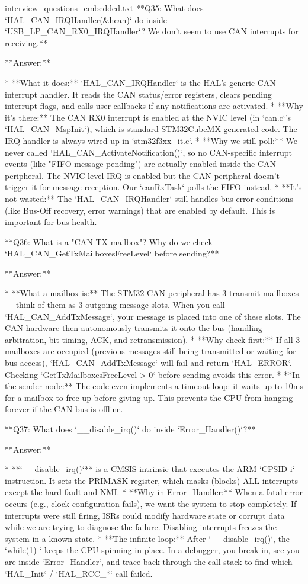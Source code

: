 \begin{filecontents*}{interview_questions_embedded.txt}
**Q35: What does `HAL_CAN_IRQHandler(&hcan)` do inside `USB_LP_CAN_RX0_IRQHandler`? We don't seem to use CAN interrupts for receiving.**

**Answer:**

* **What it does:** `HAL_CAN_IRQHandler` is the HAL's generic CAN interrupt handler. It reads the CAN status/error registers, clears pending interrupt flags, and calls user callbacks if any notifications are activated.
* **Why it's there:** The CAN RX0 interrupt is enabled at the NVIC level (in `can.c`'s `HAL_CAN_MspInit`), which is standard STM32CubeMX-generated code. The IRQ handler is always wired up in `stm32f3xx_it.c`.
* **Why we still poll:** We never called `HAL_CAN_ActivateNotification()`, so no CAN-specific interrupt events (like "FIFO message pending") are actually enabled inside the CAN peripheral. The NVIC-level IRQ is enabled but the CAN peripheral doesn't trigger it for message reception. Our `canRxTask` polls the FIFO instead.
* **It's not wasted:** The `HAL_CAN_IRQHandler` still handles bus error conditions (like Bus-Off recovery, error warnings) that are enabled by default. This is important for bus health.

**Q36: What is a "CAN TX mailbox"? Why do we check `HAL_CAN_GetTxMailboxesFreeLevel` before sending?**

**Answer:**

* **What a mailbox is:** The STM32 CAN peripheral has 3 transmit mailboxes — think of them as 3 outgoing message slots. When you call `HAL_CAN_AddTxMessage`, your message is placed into one of these slots. The CAN hardware then autonomously transmits it onto the bus (handling arbitration, bit timing, ACK, and retransmission).
* **Why check first:** If all 3 mailboxes are occupied (previous messages still being transmitted or waiting for bus access), `HAL_CAN_AddTxMessage` will fail and return `HAL_ERROR`. Checking `GetTxMailboxesFreeLevel > 0` before sending avoids this error.
* **In the sender node:** The code even implements a timeout loop: it waits up to 10ms for a mailbox to free up before giving up. This prevents the CPU from hanging forever if the CAN bus is offline.

**Q37: What does `__disable_irq()` do inside `Error_Handler()`?**

**Answer:**

* **`__disable_irq()`** is a CMSIS intrinsic that executes the ARM `CPSID i` instruction. It sets the PRIMASK register, which masks (blocks) ALL interrupts except the hard fault and NMI.
* **Why in Error_Handler:** When a fatal error occurs (e.g., clock configuration fails), we want the system to stop completely. If interrupts were still firing, ISRs could modify hardware state or corrupt data while we are trying to diagnose the failure. Disabling interrupts freezes the system in a known state.
* **The infinite loop:** After `__disable_irq()`, the `while(1) {}` keeps the CPU spinning in place. In a debugger, you break in, see you are inside `Error_Handler`, and trace back through the call stack to find which `HAL_Init` / `HAL_RCC_*` call failed.


\end{filecontents*}
